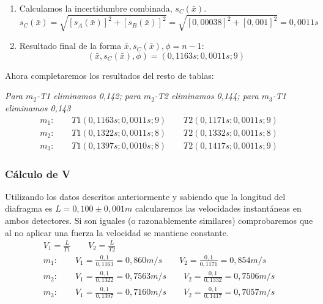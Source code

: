 \documentclass[12pt, a4paper, titlepage]{article}
\begin{document}
\begin{enumerate}
    \item Calculamos la incertidumbre combinada, $s_C(\bar{x})$.
    \begin{equation}
      s_C(\bar{x}) = \sqrt{[s_A(\bar{x})]^2 + [s_B(\bar{x})]^2} = \sqrt{[0,00038]^2 + [0,001]^2} = 0,0011 s \label{ec:scx}
    \end{equation}

    \item Resultado final de la forma $\bar{x}, s_C(\bar{x}), \phi=n-1$:
    \begin{equation*}
      (\bar{x}, s_C(\bar{x}), \phi) = (0,1163s; 0,0011s; 9)
    \end{equation*}
  \end{enumerate}

  Ahora completaremos los resultados del resto de tablas:

  \textit{Para $m_2$-T1 eliminamos 0,142; para $m_2$-T2 eliminamos 0,144; para $m_3$-T1 eliminamos 0,143}
  \begin{gather*}
    m_1: \qquad T1(0,1163s;0,0011s;9) \qquad T2(0,1171s;0,0011s;9) \\
    m_2: \qquad T1(0,1322s;0,0011s;8) \qquad T2(0,1332s;0,0011s;8) \\
    m_3: \qquad T1(0,1397s;0,0010s;8) \qquad T2(0,1417s;0,0011s;9)
  \end{gather*}

  \subsubsection{Cálculo de V}

  Utilizando los datos descritos anteriormente y sabiendo que la longitud del diafragma es $L=0,100 \pm 0,001 m$ calcularemos las velocidades instantáneas en ambos detectores. Si son iguales (o razonablemente similares) comprobaremos que al no aplicar una fuerza la velocidad se mantiene constante.
  \begin{gather}
    V_1 = \frac{L}{T1} \qquad V_2 = \frac{L}{T2} \label{ec:velinst} \\
    m_1: \qquad V_1 = \frac{0,1}{0,1163} = 0,860 m/s \qquad V_2 = \frac{0,1}{0,1171} = 0,854 m/s \nonumber \\
    m_2: \qquad V_1 = \frac{0,1}{0,1322} = 0,7563 m/s \qquad V_2 = \frac{0,1}{0,1332} = 0,7506 m/s \nonumber \\
    m_3: \qquad V_1 = \frac{0,1}{0,1397} = 0,7160 m/s \qquad V_2 = \frac{0,1}{0,1417} = 0,7057 m/s \nonumber
  \end{gather}
\end{document}
